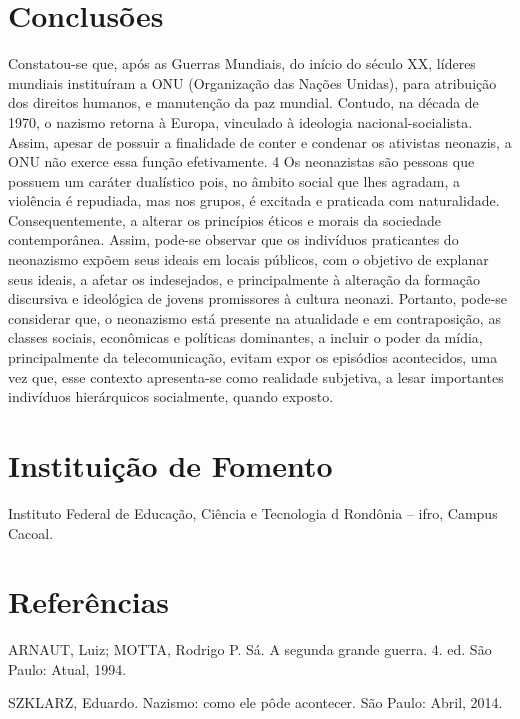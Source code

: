 \documentclass[article,12pt,onesidea,4paper,english,brazil]{abntex2}
\begin{document}
	\section*{Conclusões}
	
Constatou-se que, após as Guerras Mundiais, do início do século XX, líderes mundiais instituíram a ONU (Organização das Nações Unidas), para atribuição dos direitos humanos, e manutenção da paz mundial.
Contudo, na década de 1970, o nazismo retorna à Europa, vinculado à ideologia nacional-socialista. Assim, apesar de possuir a finalidade de conter e condenar os ativistas neonazis, a ONU não exerce essa função efetivamente.
4
Os neonazistas são pessoas que possuem um caráter dualístico pois, no âmbito social que lhes agradam, a violência é repudiada, mas nos grupos, é excitada e praticada com naturalidade. Consequentemente, a alterar os princípios éticos e morais da sociedade contemporânea.
Assim, pode-se observar que os indivíduos praticantes do neonazismo expõem seus ideais em locais públicos, com o objetivo de explanar seus ideais, a afetar os indesejados, e principalmente à alteração da formação discursiva e ideológica de jovens promissores à cultura neonazi.
Portanto, pode-se considerar que, o neonazismo está presente na atualidade e em contraposição, as classes sociais, econômicas e políticas dominantes, a incluir o poder da mídia, principalmente da telecomunicação, evitam expor os episódios acontecidos, uma vez que, esse contexto apresenta-se como realidade subjetiva, a lesar importantes indivíduos hierárquicos socialmente, quando exposto.
	
	\section*{Instituição de Fomento}
	
	Instituto Federal de Educação, Ciência e Tecnologia d Rondônia – ifro, Campus
	Cacoal.
	
	\sloppy
	\section*{Referências}
	
\noindent ARNAUT, Luiz; MOTTA, Rodrigo P. Sá. A segunda grande guerra. 4. ed. São Paulo: Atual, 1994.

\noindent SZKLARZ, Eduardo. Nazismo: como ele pôde acontecer. São Paulo: Abril, 2014.
	
\end{document}
